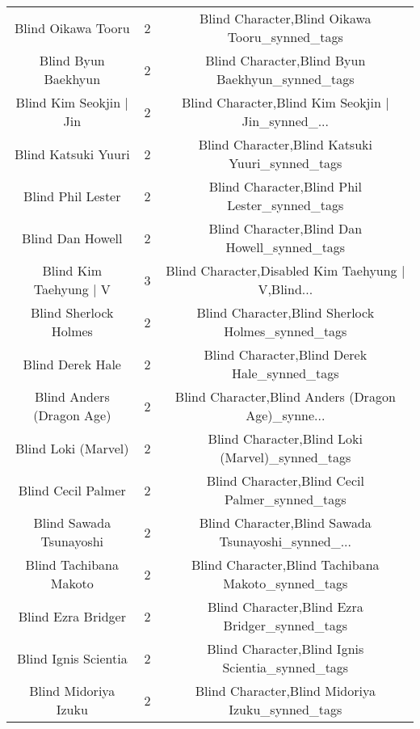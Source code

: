 \begin{table}[h!]
{\begin{tabular}{|c|c|c|}
                                Blind Oikawa Tooru &          2 &     Blind Character,Blind Oikawa Tooru\_synned\_tags \\
                               Blind Byun Baekhyun &          2 &    Blind Character,Blind Byun Baekhyun\_synned\_tags \\
                           Blind Kim Seokjin | Jin &          2 & Blind Character,Blind Kim Seokjin | Jin\_synned\_... \\
                               Blind Katsuki Yuuri &          2 &    Blind Character,Blind Katsuki Yuuri\_synned\_tags \\
                                 Blind Phil Lester &          2 &      Blind Character,Blind Phil Lester\_synned\_tags \\
                                  Blind Dan Howell &          2 &       Blind Character,Blind Dan Howell\_synned\_tags \\
                            Blind Kim Taehyung | V &          3 & Blind Character,Disabled Kim Taehyung | V,Blind... \\
                             Blind Sherlock Holmes &          2 &  Blind Character,Blind Sherlock Holmes\_synned\_tags \\
                                  Blind Derek Hale &          2 &       Blind Character,Blind Derek Hale\_synned\_tags \\
                         Blind Anders (Dragon Age) &          2 & Blind Character,Blind Anders (Dragon Age)\_synne... \\
                               Blind Loki (Marvel) &          2 &    Blind Character,Blind Loki (Marvel)\_synned\_tags \\
                                Blind Cecil Palmer &          2 &     Blind Character,Blind Cecil Palmer\_synned\_tags \\
                           Blind Sawada Tsunayoshi &          2 & Blind Character,Blind Sawada Tsunayoshi\_synned\_... \\
                            Blind Tachibana Makoto &          2 & Blind Character,Blind Tachibana Makoto\_synned\_tags \\
                                Blind Ezra Bridger &          2 &     Blind Character,Blind Ezra Bridger\_synned\_tags \\
                              Blind Ignis Scientia &          2 &   Blind Character,Blind Ignis Scientia\_synned\_tags \\
                              Blind Midoriya Izuku &          2 &   Blind Character,Blind Midoriya Izuku\_synned\_tags \\

\end{tabular}}
\end{table}
